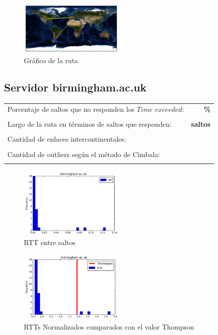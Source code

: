 \begin{figure}[H]
  \centering
    \includegraphics[width=0.45\textwidth]{grafico-rutas/bifrost-is.png}
  \caption{Gráfico de la ruta}
  \label{entropia-s}
\end{figure}




\subsection{Servidor birmingham.ac.uk}

\begin{center}
\begin{tabular}{p{6.5cm}r}
Porcentaje de saltos que no responden los $Time$ $exceeded$: & \textbf{\%} \\ \\ 
Largo de la ruta en términos de saltos que responden: &\textbf{ saltos} \\ \\
Cantidad de enlaces intercontinentales: & \textbf{} \\ \\
Cantidad de outliers según el método de Cimbala: & \textbf{} \\ \\
\end{tabular}
\end{center}

\begin{figure}[H]
  \centering
    \includegraphics[width=0.45\textwidth]{histogramas_rtt/birmingham-ac-uk.png}
  \caption{RTT entre saltos}
  \label{entropia-s}
\end{figure}

\begin{figure}[H]
  \centering
    \includegraphics[width=0.45\textwidth]{histogramas_thompson/birmingham-ac-uk.png}
  \caption{RTTs Normalizados comparados con el valor Thompson}
  \label{entropia-s}
\end{figure}

